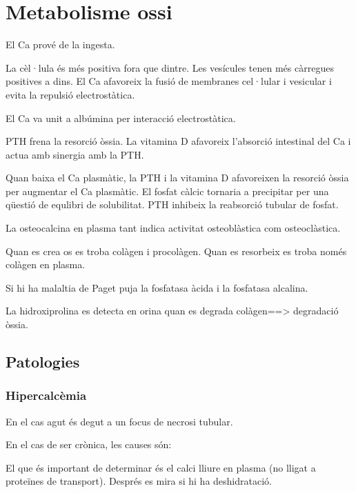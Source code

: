 
\section{Metabolisme ossi}
\label{sec:metabolisme-ossi}

El Ca prové de la ingesta.

La cèl·lula és més positiva fora que dintre. Les vesícules tenen més
càrregues positives a dins. El Ca afavoreix la fusió de membranes
cel·lular i vesicular i evita la repulsió electrostàtica.

El Ca va unit a albúmina per interacció electrostàtica.

PTH frena la resorció òssia.  La vitamina D afavoreix l'absorció
intestinal del Ca i actua amb sinergia amb la PTH.

Quan baixa el Ca plasmàtic, la PTH i la vitamina D afavoreixen la
resorció òssia per augmentar el Ca plasmàtic. El fosfat càlcic
tornaria a precipitar per una qüestió de equlibri de solubilitat. PTH
inhibeix la reabsorció tubular de fosfat.

La osteocalcina en plasma tant indica activitat osteoblàstica com
osteoclàstica.

Quan es crea os es troba colàgen i procolàgen. Quan es resorbeix es
troba només colàgen en plasma.

Si hi ha malaltia de Paget puja la fosfatasa àcida i la fosfatasa
alcalina.

La hidroxiprolina es detecta en orina quan es degrada colàgen==>
degradació òssia.

\subsection{Patologies}
\label{sec:patologies}

\subsubsection{Hipercalcèmia}
\label{sec:hipercalcemia}

En el cas agut és degut a un focus de necrosi tubular. 

En el cas de ser crònica, les causes són:

El que és important de determinar és el calci lliure en plasma (no
lligat a proteïnes de transport). Després es mira si hi ha
deshidratació.


